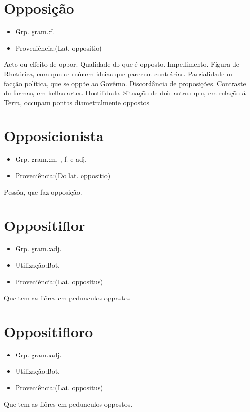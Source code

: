 \section{Opposição}
\begin{itemize}
\item {Grp. gram.:f.}
\end{itemize}
\begin{itemize}
\item {Proveniência:(Lat. \textunderscore oppositio\textunderscore )}
\end{itemize}
Acto ou effeito de oppor.
Qualidade do que é opposto.
Impedimento.
Figura de Rhetórica, com que se reúnem ideias que parecem contrárias.
Parcialidade ou facção política, que se oppõe ao Govêrno.
Discordância de proposições.
Contraste de fórmas, em bellas-artes.
Hostilidade.
Situação de dois astros que, em relação á Terra, occupam pontos diametralmente oppostos.
\section{Opposicionista}
\begin{itemize}
\item {Grp. gram.:m. ,  f.  e  adj.}
\end{itemize}
\begin{itemize}
\item {Proveniência:(Do lat. \textunderscore oppositio\textunderscore )}
\end{itemize}
Pessôa, que faz opposição.
\section{Oppositiflor}
\begin{itemize}
\item {Grp. gram.:adj.}
\end{itemize}
\begin{itemize}
\item {Utilização:Bot.}
\end{itemize}
\begin{itemize}
\item {Proveniência:(Lat. \textunderscore oppositus\textunderscore )}
\end{itemize}
Que tem as flôres em pedunculos oppostos.
\section{Oppositifloro}
\begin{itemize}
\item {Grp. gram.:adj.}
\end{itemize}
\begin{itemize}
\item {Utilização:Bot.}
\end{itemize}
\begin{itemize}
\item {Proveniência:(Lat. \textunderscore oppositus\textunderscore )}
\end{itemize}
Que tem as flôres em pedunculos oppostos.
